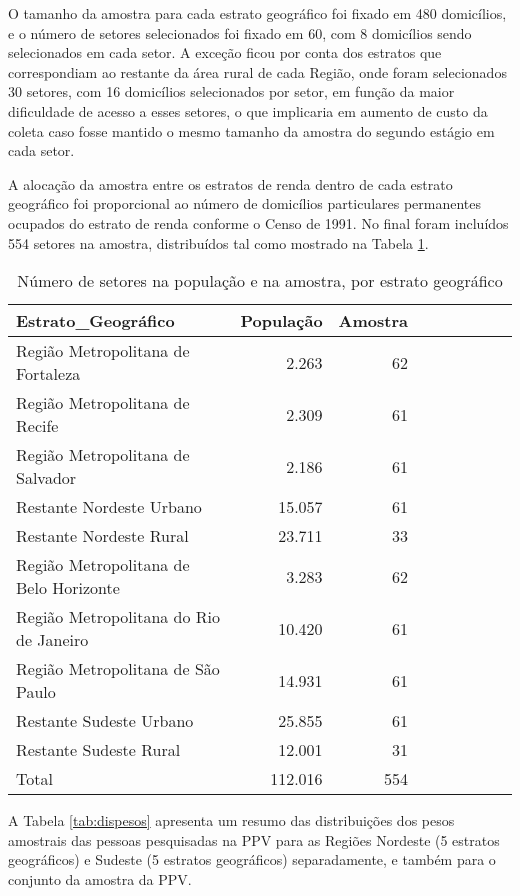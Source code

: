 \documentclass[]{book}
\theoremstyle{definition}
\theoremstyle{definition}
\theoremstyle{definition}
\theoremstyle{remark}
\begin{document}
O tamanho da amostra para cada estrato geográfico foi fixado em 480
domicílios, e o número de setores selecionados foi fixado em 60, com 8
domicílios sendo selecionados em cada setor. A exceção ficou por conta
dos estratos que correspondiam ao restante da área rural de cada Região,
onde foram selecionados 30 setores, com 16 domicílios selecionados por
setor, em função da maior dificuldade de acesso a esses setores, o que
implicaria em aumento de custo da coleta caso fosse mantido o mesmo
tamanho da amostra do segundo estágio em cada setor.

A alocação da amostra entre os estratos de renda dentro de cada estrato
geográfico foi proporcional ao número de domicílios particulares
permanentes ocupados do estrato de renda conforme o Censo de 1991. No
final foram incluídos 554 setores na amostra, distribuídos tal como
mostrado na Tabela \ref{tab:numset}.

\begin{table}

\caption{\label{tab:numset}Número de setores na população e na amostra, por estrato geográfico}
\centering
\begin{tabular}[t]{lrrlrrlrr}
\toprule
Estrato\_Geográfico & População & Amostra\\
\midrule
Região Metropolitana de Fortaleza & 2.263 & 62\\
Região Metropolitana de Recife & 2.309 & 61\\
Região Metropolitana de Salvador & 2.186 & 61\\
Restante Nordeste Urbano & 15.057 & 61\\
Restante Nordeste Rural & 23.711 & 33\\
\addlinespace
Região Metropolitana de Belo Horizonte & 3.283 & 62\\
Região Metropolitana do Rio de Janeiro & 10.420 & 61\\
Região Metropolitana de São Paulo & 14.931 & 61\\
Restante Sudeste Urbano & 25.855 & 61\\
Restante Sudeste Rural & 12.001 & 31\\
Total & 112.016 & 554\\
\bottomrule
\end{tabular}
\end{table}

A Tabela \ref{tab:dispesos} apresenta um resumo das distribuições dos
pesos amostrais das pessoas pesquisadas na PPV para as Regiões Nordeste
(5 estratos geográficos) e Sudeste (5 estratos geográficos)
separadamente, e também para o conjunto da amostra da PPV.
\end{document}
